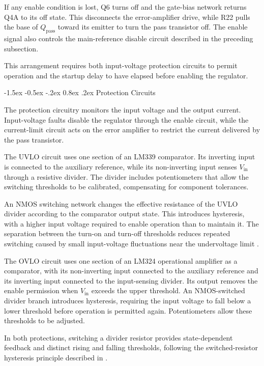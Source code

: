 \documentclass[conference]{IEEEtran}
\makeatletter
\renewcommand\subsection{\@startsection{subsection}{2}{\z@}%
  {-1.5ex \@plus -0.5ex \@minus -.2ex}%
  {0.8ex \@plus .2ex}%
  {\normalfont\sffamily\normalsize\bfseries}}
\makeatother
\begin{document}
If any enable condition is lost, Q6 turns off and
the gate-bias network returns Q4A to its off state.
This disconnects the error-amplifier drive, while
R22 pulls the base of \(Q_{\mathrm{pass}}\) toward
its emitter to turn the pass transistor off.
The enable signal also controls the main-reference
disable circuit described in the preceding subsection.

This arrangement requires both input-voltage protection
circuits to permit operation and the startup delay
to have elapsed before enabling the regulator.

\subsection{Protection Circuits}

The protection circuitry monitors the input voltage
and the output current. Input-voltage faults disable
the regulator through the enable circuit, while the
current-limit circuit acts on the error amplifier
to restrict the current delivered by the pass transistor.

The UVLO circuit uses one section of an LM339 comparator.
Its inverting input is connected to the auxiliary
reference, while its non-inverting input senses
\(V_{\mathrm{in}}\) through a resistive divider.
The divider includes potentiometers that allow the
switching thresholds to be calibrated, compensating
for component tolerances.

An NMOS switching network changes the effective
resistance of the UVLO divider according to the
comparator output state. This introduces hysteresis,
with a higher input voltage required to enable
operation than to maintain it. The separation between
the turn-on and turn-off thresholds reduces repeated
switching caused by small input-voltage fluctuations
near the undervoltage limit \cite{sachdev_hysteresis_2021}.

The OVLO circuit uses one section of an LM324
operational amplifier as a comparator, with its
non-inverting input connected to the auxiliary
reference and its inverting input connected to
the input-sensing divider. Its output removes
the enable permission when \(V_{\mathrm{in}}\)
exceeds the upper threshold. An NMOS-switched
divider branch introduces hysteresis, requiring
the input voltage to fall below a lower threshold
before operation is permitted again. Potentiometers
allow these thresholds to be adjusted.

In both protections, switching a divider resistor provides
state-dependent feedback and distinct rising and falling
thresholds, following the switched-resistor hysteresis principle
described in \cite{sachdev_hysteresis_2021}.
\end{document}
